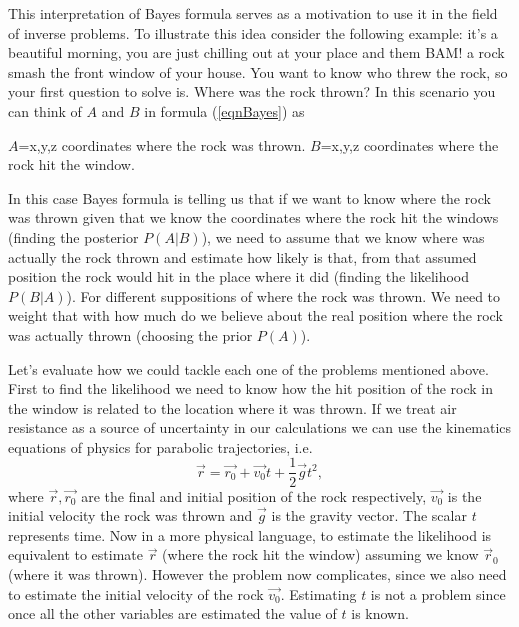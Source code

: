 \documentclass[12pt]{book}
\begin{document}
This interpretation of Bayes formula serves as a motivation to use it in the field of inverse problems. 
To illustrate this idea consider the following example: it's a beautiful morning, you are just chilling 
out at your place and them BAM! a rock smash the front window of your house. You want to know who threw
the rock, so your first question to solve is. Where was the rock thrown? In this scenario you can
think of $A$ and $B$  in formula (\ref{eqnBayes}) as
\begin{center}
$A$=x,y,z coordinates where the rock was thrown.\newline
$B$=x,y,z coordinates where the rock hit the window.
\end{center}
In this case Bayes formula is telling us that if we want to know where the rock was thrown given that we 
know the coordinates where the rock hit the windows (finding the posterior $P(A|B)$), we need to assume that we know
where was actually the rock thrown and estimate how likely is that, from that assumed position the rock 
would hit in the place where it did (finding the likelihood $P(B|A)$). For different suppositions of where the rock
was thrown. We need to weight that with how much do we  believe about the real position where the rock
 was actually thrown 
(choosing the prior $P(A)$).
\newline



Let's evaluate how we could tackle each one of the problems mentioned above. First to find the likelihood
we need to know how the hit position of the rock  in the window  is related to the location where it was
thrown. If we treat air resistance as a source of uncertainty in our calculations we can use
the kinematics equations of physics for parabolic trajectories, i.e.
\begin{equation}\label{eqnKinematics}
\vec{r}=\vec{r_{0}}+\vec{v_{0}}t+\frac{1}{2}\vec{g}t^{2},
\end{equation} 
where $\vec{r},\vec{r_{0}}$ are the final and initial position of the rock respectively, $\vec{v_{0}}$ is 
the initial velocity the rock was thrown and $\vec{g}$ is the gravity vector. The scalar $t$ represents time.
Now in a more physical language, to estimate the likelihood is equivalent to estimate $\vec{r}$ (where the 
rock hit the window) assuming we know $\vec{r}_{0}$ (where it was thrown). However the problem now complicates, since
we also need to estimate the initial velocity of the rock $\vec{v_{0}}$. Estimating $t$ is not a problem
since once all the other variables are estimated the value of $t$ is known. 
\end{document}
